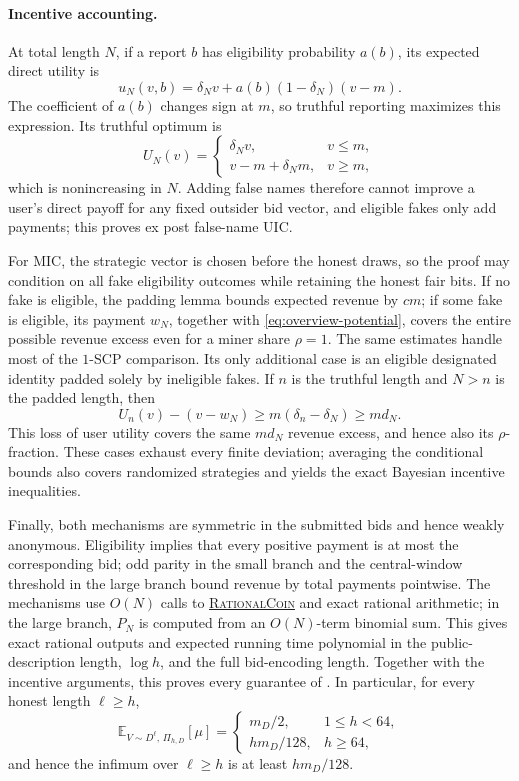 \documentclass[11pt]{article}
\begin{document}
\paragraph{Incentive accounting.}
At total length $N$, if a report $b$ has eligibility probability $a(b)$, its
expected direct utility is
\begin{equation}
u_N(v,b)=\delta_Nv+a(b)(1-\delta_N)(v-m).
\label{eq:overview-direct-utility}
\end{equation}
The coefficient of $a(b)$ changes sign at $m$, so truthful reporting maximizes
this expression.  Its truthful optimum is
\[
U_N(v)=
\begin{cases}
\delta_Nv,&v\le m,\\
v-m+\delta_Nm,&v\ge m,
\end{cases}
\]
which is nonincreasing in $N$.  Adding false names therefore cannot improve a
user's direct payoff for any fixed outsider bid vector, and eligible fakes only
add payments; this proves ex post false-name UIC.

For MIC, the strategic vector is chosen before the honest draws, so the proof
may condition on all fake eligibility outcomes while retaining the honest fair
bits.  If no fake is eligible, the padding lemma bounds expected revenue by
$cm$; if some fake is eligible, its payment $w_N$, together with
\eqref{eq:overview-potential}, covers the entire possible revenue excess even
for a miner share $\rho=1$.  The same estimates handle most of the $1$-SCP
comparison.  Its only additional case is an eligible designated identity
padded solely by ineligible fakes.  If $n$ is the truthful length and $N>n$ is
the padded length, then
\[
U_n(v)-(v-w_N)
\ge m(\delta_n-\delta_N)
\ge md_N.
\]
This loss of user utility covers the same $md_N$ revenue excess, and hence also
its $\rho$-fraction.  These cases exhaust every finite deviation; averaging the
conditional bounds also covers randomized strategies and yields the exact
Bayesian incentive inequalities.

Finally, both mechanisms are symmetric in the submitted bids and hence weakly
anonymous.  Eligibility implies that every positive payment is at most the
corresponding bid; odd parity in the small branch and the central-window
threshold in the large branch bound revenue by total payments pointwise.  The
mechanisms use $O(N)$ calls to
\hyperref[alg:rational-coin]{\textsc{RationalCoin}} and exact rational
arithmetic; in the large branch, $P_N$ is computed from an $O(N)$-term binomial
sum.  This gives exact rational outputs and expected running time polynomial in
the public-description length, $\log h$, and the full bid-encoding length.
Together with the incentive arguments, this proves every guarantee of
.  In particular, for every honest length $\ell\ge h$,
\[
\mathbb{E}_{V\sim D^\ell,\,\Pi_{h,D}}[\mu]
=
\begin{cases}
m_D/2,&1\le h<64,\\[1ex]
h m_D/128,&h\ge64,
\end{cases}
\]
and hence the infimum over $\ell\ge h$ is at least $hm_D/128$.
\end{document}

